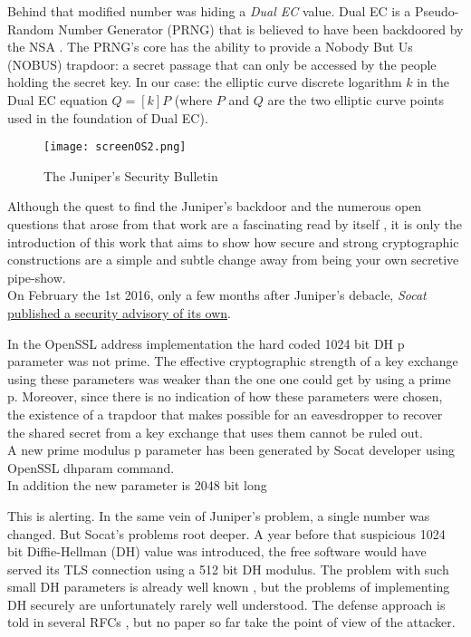 \documentclass[a4paper,11pt]{article}
\begin{document}
Behind that modified number was hiding a \emph{Dual EC} value. Dual EC is a Pseudo-Random Number Generator (PRNG) that is believed to have been backdoored by the NSA \cite{dualEC}. The PRNG's core has the ability to provide a Nobody But Us (NOBUS) trapdoor: a secret passage that can only be accessed by the people holding the secret key. In our case: the elliptic curve discrete logarithm $k$ in the Dual EC equation $Q = [k]P$ (where $P$ and $Q$ are the two elliptic curve points used in the foundation of Dual EC).\\

\begin{figure}[H]
\centering
\texttt{[image: screenOS2.png]}
\caption{The Juniper's Security Bulletin}\label{screenOS}
\end{figure}

Although the quest to find the Juniper's backdoor and the numerous open questions that arose from that work are a fascinating read by itself \cite{juniper}, it is only the introduction of this work that aims to show how secure and strong cryptographic constructions are a simple and subtle change away from being your own secretive pipe-show.\\

On February the 1st 2016, only a few months after Juniper's debacle, \emph{Socat} \href{http://www.openwall.com/lists/oss-security/2016/02/01/4}{published a security advisory of its own}.

\begin{displayquote}
In the OpenSSL address implementation the hard coded 1024 bit DH p parameter was not prime. The effective cryptographic strength of a key exchange using these parameters was weaker than the one one could get by using a prime p. Moreover, since there is no indication of how these parameters were chosen, the existence of a trapdoor that makes possible for an eavesdropper to recover the shared secret from a key exchange that uses them cannot be ruled out.\\
A new prime modulus p parameter has been generated by Socat developer using OpenSSL dhparam command.\\
In addition the new parameter is 2048 bit long
\end{displayquote}

This is alerting. In the same vein of Juniper's problem, a single number was changed. But Socat's problems root deeper. A year before that suspicious 1024 bit Diffie-Hellman (DH) value was introduced, the free software would have served its TLS connection using a 512 bit DH modulus. The problem with such small DH parameters is already well known \cite{logjam}, but the problems of implementing DH securely are unfortunately rarely well understood. The defense approach is told in several RFCs \cite{rfc2631} \cite{rfc2785}, but no paper so far take the point of view of the attacker.\\
\end{document}
